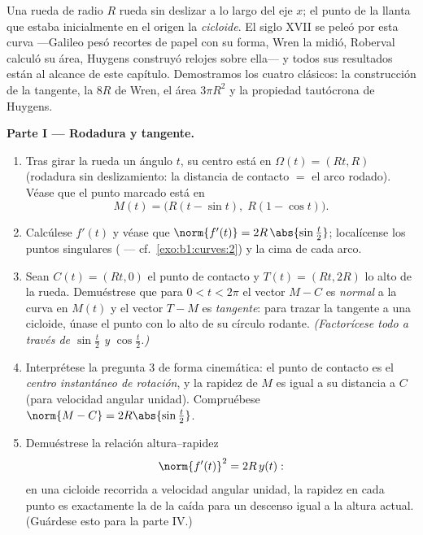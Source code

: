 \begin{problem}\label{pb:b1:curves:1}
Una rueda de radio $R$ rueda sin deslizar a lo largo del eje $x$; el
punto de la llanta que estaba inicialmente en el origen
 la \emph{cicloide}. El siglo XVII se peleó por esta curva
---Galileo pesó recortes de papel con su forma, Wren la midió,
Roberval calculó su área, Huygens construyó relojes sobre ella--- y
todos sus resultados están al alcance de este capítulo. Demostramos
los cuatro clásicos: la construcción de la tangente, la 
$8R$ de Wren, el área $3\pi R^2$ y la propiedad tautócrona de
Huygens.

\medskip
\noindent\textbf{Parte I --- Rodadura y tangente.}
\begin{enumerate}
  \item Tras girar la rueda un ángulo $t$, su centro está en
        $\Omega(t) = (Rt, R)$ (rodadura sin deslizamiento: la
        distancia de contacto $=$ el arco rodado). Véase que el
        punto marcado está en
        \[
        M(t) = \bigl(R(t - \sin t),\; R(1 - \cos t)\bigr).
        \]
  \item Calcúlese $f'(t)$ y véase que
        $\norm{f'(t)} = 2R\,\abs{\sin\frac t2}$; localícense los
        puntos singulares ( --- cf.\
        \cref{exo:b1:curves:2}) y la cima de cada arco.
  \item Sean $C(t) = (Rt, 0)$ el punto de contacto y
        $T(t) = (Rt, 2R)$ lo alto de la rueda. Demuéstrese que para
        $0 < t < 2\pi$ el vector $M - C$ es \emph{normal} a la curva
        en $M(t)$ y el vector $T - M$ es \emph{tangente}: para
        trazar la tangente a una cicloide, únase el punto con lo
        alto de su círculo rodante. \emph{(Factorícese todo a través
        de $\sin\frac t2$ y $\cos\frac t2$.)}
  \item Interprétese la pregunta 3 de forma cinemática: el punto de
        contacto es el \emph{centro instantáneo de rotación}, y la
        rapidez de $M$ es igual a su distancia a $C$ (para velocidad
        angular unidad). Compruébese
        $\norm{M - C} = 2R\abs{\sin\frac t2}$.
  \item Demuéstrese la relación altura--rapidez
        \[
        \norm{f'(t)}^2 = 2R\,y(t) :
        \]
        en una cicloide recorrida a velocidad angular unidad, la
        rapidez en cada punto es exactamente la de la caída 
        para un descenso igual a la altura actual. (Guárdese esto
        para la parte IV.)
\end{enumerate}


\end{problem}
